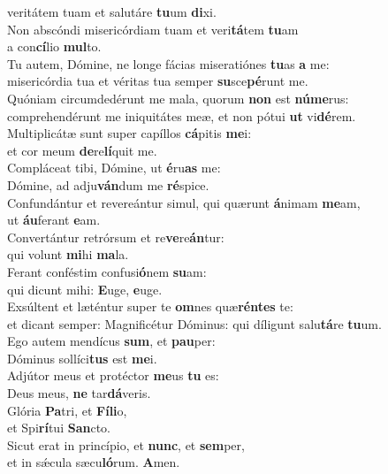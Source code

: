\oddverse veritátem tuam et salutáre \textbf{tu}um \textbf{di}xi.\\
\evenverse Non abscóndi misericórdiam tuam et veri\textbf{tá}tem \textbf{tu}am~\*\\
\evenverse a con\textbf{cí}lio \textbf{mul}to.\\
\oddverse Tu autem, Dómine, ne longe fácias miseratiónes \textbf{tu}as \textbf{a} me:~\*\\
\oddverse misericórdia tua et véritas tua semper \textbf{su}sce\textbf{pé}runt me.\\
\evenverse Quóniam circumdedérunt me mala, quorum \textbf{non} est \textbf{nú}\textbf{me}rus:~\*\\
\evenverse comprehendérunt me iniquitátes meæ, et non pótui \textbf{ut} vi\textbf{dé}rem.\\
\oddverse Multiplicátæ sunt super capíllos \textbf{cá}pitis \textbf{me}i:~\*\\
\oddverse et cor meum \textbf{de}re\textbf{lí}quit me.\\
\evenverse Compláceat tibi, Dómine, ut \textbf{é}ru\textbf{as} me:~\*\\
\evenverse Dómine, ad adju\textbf{ván}dum me \textbf{ré}spice.\\
\oddverse Confundántur et revereántur simul, qui quærunt \textbf{á}nimam \textbf{me}am,~\*\\
\oddverse ut \textbf{áu}ferant \textbf{e}am.\\
\evenverse Convertántur retrórsum et re\textbf{ve}re\textbf{án}tur:~\*\\
\evenverse qui volunt \textbf{mi}hi \textbf{ma}la.\\
\oddverse Ferant conféstim confusi\textbf{ó}nem \textbf{su}am:~\*\\
\oddverse qui dicunt mihi: \textbf{E}uge, \textbf{e}uge.\\
\evenverse Exsúltent et læténtur super te \textbf{om}nes quæ\textbf{rén}\textbf{tes} te:~\*\\
\evenverse et dicant semper: Magnificétur Dóminus: qui díligunt salu\textbf{tá}re \textbf{tu}um.\\
\oddverse Ego autem mendícus \textbf{sum}, et \textbf{pau}per:~\*\\
\oddverse Dóminus sollíci\textbf{tus} est \textbf{me}i.\\
\evenverse Adjútor meus et protéctor \textbf{me}us \textbf{tu} es:~\*\\
\evenverse Deus meus, \textbf{ne} tar\textbf{dá}veris.\\
\oddverse Glória \textbf{Pa}tri, et \textbf{Fí}\textbf{li}o,~\*\\
\oddverse et Spi\textbf{rí}tui \textbf{San}cto.\\
\evenverse Sicut erat in princípio, et \textbf{nunc}, et \textbf{sem}per,~\*\\
\evenverse et in sǽcula sæcu\textbf{ló}rum. \textbf{A}men.\\
